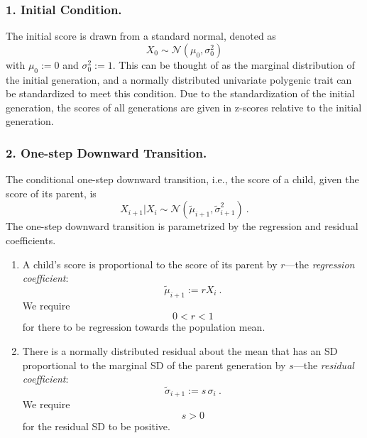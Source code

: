 \documentclass{svproc} %
\begin{document}
\subsubsection{1. Initial Condition.} 

The initial score is drawn from a standard normal, denoted as
\begin{equation}
X_0 \sim \mathcal{N}(\mu_0, \sigma_0^2) 
\label{eq:initial_state}
\end{equation}
with $\mu_0 := 0$ and $\sigma_0^2 := 1$. This can be thought of as the marginal distribution of the initial generation, and a normally distributed univariate polygenic trait can be standardized to meet this condition. Due to the standardization of the initial generation, the scores of all generations are given in z-scores relative to the initial generation. 

\subsubsection{2. One-step Downward Transition.}

The conditional one-step downward transition, i.e., the score of a child, given the score of its parent, is
\begin{equation}
X_{i+1}|X_i \sim \mathcal{N}(\tilde{\mu}_{i+1}, \tilde{\sigma}_{i+1}^2) \ . 
\label{eq:one_step}
\end{equation}
The one-step downward transition is parametrized by the regression and residual coefficients.

\begin{enumerate}
\item A child's score is proportional to the score of its parent by $r$---the \emph{regression coefficient}:  
\begin{equation}
\tilde{\mu}_{i+1} := rX_i \ .
\label{eq:mu_tilde}
\end{equation}
We require
\begin{equation}
0 < r < 1
\label{eq:r_require}
\end{equation}
for there to be regression towards the population mean. 

\item There is a normally distributed residual about the mean that has an SD proportional to the marginal SD of the parent generation by $s$---the \emph{residual coefficient}:
\begin{equation}
\tilde{\sigma}_{i+1} := s \, \sigma_i \ .
\label{eq:sigma_tilde}
\end{equation}
We require 
\begin{equation}
s > 0
\label{eq:s_require}
\end{equation}
for the residual SD to be positive.
\end{enumerate}
\end{document}
